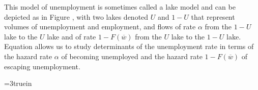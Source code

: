   This model of unemployment   is sometimes called a lake model and
can be depicted as in Figure , %
 with two lakes denoted
$U$ and $1-U$ that represent volumes of unemployment and employment, and flows
of rate $\alpha$ from the $1-U$ lake to the $U$ lake
 and of rate $1-F(\overline w)$ from
the $U$ lake  to the $1-U$ lake.    Equation  allows us to
study  determinants of the  unemployment rate in
terms of the hazard rate  $\alpha$ of becoming unemployed and
the hazard rate  $1 - F(\overline w)$ of escaping unemployment.


\centerline{\epsfxsize=3truein}
\caption{Lake model with flows of rate $\alpha$ from employment state $1-U$ to
unemployment state $U$ and of rate $[1-F(\overline w)]$ from $U$ to $1-U$.}
\endfigure





